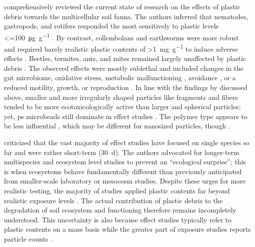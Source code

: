  comprehensively reviewed the current state of research on the effects of plastic debris towards the multicellular soil fauna. The authors inferred that nematodes, gastropods, and rotifers responded the most sensitively to plastic levels \SI{<=100}{\micro\gram\per\gram} \citep[for instance,][]{KimSizedependent2020,SongUptake2019}. By contrast, collembolans and earthworms were more robust and required barely realistic plastic contents of \SI{>1}{\milli\gram\per\gram} to induce adverse effects \citep{JuEffects2019,DingEffect2021,LahiveMicroplastic2019}. Beetles, termites, ants, and mites remained largely unaffected by plastic debris \citep[for instance,][]{PengBiodegradation2019,ZhuTrophic2018}. The observed effects were mostly sublethal and included changes in the gut microbiome, oxidative stress, metabolic malfunctioning \citep{JuEffects2019,ChenDefense2020,Rodriguez-SeijoOxidative2018}, avoidance \citep{DingEffect2021}, or a reduced motility, growth, or reproduction \citep{BootsEffects2019,LahiveMicroplastic2019}. In line with the findings by \citet{deSouzaMachadoMicroplastics2019} discussed above, smaller and more irregularly shaped particles like fragments and fibers tended to be more ecotoxicologically active than larger and spherical particles; yet, \ac{ps} microbeads still dominate in effect studies \citep{BuksWhat2020}. The polymer type appears to be less influential \citep{RilligMicroplastic2020}, which may be different for nanosized particles, though \citep{RilligMicroplastic2019}.

\citet{BahoMicroplastics2021} criticized that the vast majority of effect studies have focused on single species so far and were rather short-term (\SI{30}{\day}). The authors advocated for longer-term multispecies and ecosystem level studies to prevent an ``ecological surprise''; this is when ecosystems behave fundamentally different than previously anticipated from smaller-scale laboratory or mesocosm studies. Despite these urges for more realistic testing, the majority of studies applied plastic contents far beyond realistic exposure levels \citep{BuksWhat2020}. The actual contribution of plastic debris to the degradation of soil ecosystem and functioning therefore remains incompletely understood. This uncertainty is also because effect studies typically refer to plastic contents on a mass basis while the greater part of exposure studies reports particle counts \citep{LeuschConverting2021}.


